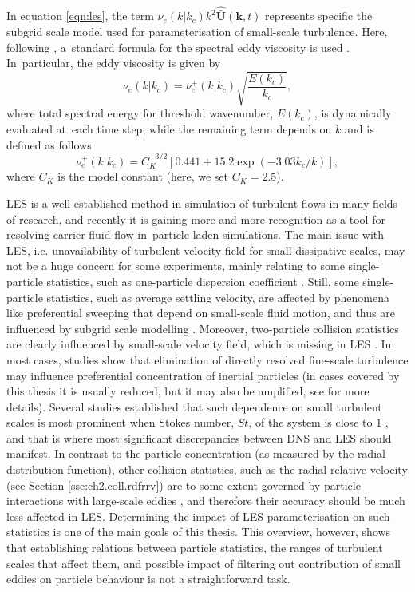 \documentclass{pracamgren}
\begin{document}
In equation \ref{eqn:les}, the term $\nu_{e}(k|k_{c})k^{2} \hat{\bar{\mathbf{U}}}(\mathbf{k}, t)$ represents specific the subgrid scale model used for parameterisation of small-scale turbulence.
Here, following \textcite{Rosa2017}, a~standard formula for the spectral eddy viscosity is used \parencite[see][]{Chollet1981}.
In~particular, the eddy viscosity is given by
\begin{equation}
\nu_{e}(k|k_{c}) = \nu_{e}^{+}(k|k_{c}) \sqrt{\frac{E(k_{c})}{k_c}} ,
\label{eqn:sgs-1}
\end{equation}
where total spectral energy for threshold wavenumber, $E(k_c)$, is dynamically evaluated at~each time step, while the remaining term depends on $k$ and is defined as follows
\begin{equation}
\nu_{e}^{+}(k|k_{c}) = C_{K}^{-3/2} [ 0.441 + 15.2 \exp( -3.03 k_{c} / k) ] ,
\label{eqn:sgs-2}
\end{equation}
where $C_{K}$ is the model constant (here, we set $C_{K} = 2.5$).

\medskip

LES is a well-established method in simulation of turbulent flows in many fields of research, and recently it is gaining more and more recognition as a tool for resolving carrier fluid flow in~particle-laden simulations.
The main issue with LES, i.e. unavailability of turbulent velocity field for small dissipative scales, may not be a huge concern for some experiments, mainly relating to some single-particle statistics, such as one-particle dispersion coefficient \parencite{Yang2008}.
Still, some single-particle statistics, such as average settling velocity, are affected by phenomena like preferential sweeping that depend on small-scale fluid motion, and thus are influenced by subgrid scale modelling \parencite{Rosa2017,Tom2019}.
Moreover, two-particle collision statistics are clearly influenced by small-scale velocity field, which is missing in LES \parencite{Jin2010}.
In most cases, studies show that elimination of directly resolved fine-scale turbulence may influence preferential concentration of inertial particles (in cases covered by this thesis it is usually reduced, but it may also be amplified, see \textcite{Fede2006} for more details).
Several studies established that such dependence on small turbulent scales is most prominent when Stokes number, $St$, of the system is close to $1$ \parencite{Wang2000,Pozorski2009,Jin2010}, and that is where most significant discrepancies between DNS and LES should manifest.
In contrast to the particle concentration (as measured by the radial distribution function), other collision statistics, such as the radial relative velocity (see Section \ref{ssc:ch2.coll.rdfrrv}) are to some extent governed by particle interactions with large-scale eddies \parencite{Wang2000}, and therefore their accuracy should be much less affected in LES. 
Determining the impact of LES parameterisation on such statistics is one of the main goals of this thesis.
This overview, however, shows that establishing relations between particle statistics, the ranges of turbulent scales that affect them, and possible impact of filtering out contribution of small eddies on particle behaviour is not a straightforward task.
\end{document}
